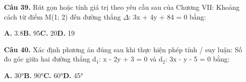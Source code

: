 \documentclass[11pt,a4paper]{article}
\begin{document}
\textbf{\color{primary} Câu 39.} Rút gọn hoặc tính giá trị theo yêu cầu sau của Chương VII: Khoảng cách từ điểm M(1; 2) đến đường thẳng $\Delta$: 3x + 4y + 84 = 0 bằng:\par
\hspace*{1.5em}\textbf{A.} 3.8\quad\quad \textbf{B.} 95\quad\quad \textbf{C.} 20\quad\quad \textbf{D.} 19\par\vspace{2pt}
\textbf{\color{primary} Câu 40.} Xác định phương án đúng sau khi thực hiện phép tính / suy luận: Số đo góc giữa hai đường thẳng d$_1$: x - 2y + 3 = 0 và d$_2$: 3x - y - 5 = 0 bằng:\par
\hspace*{1.5em}\textbf{A.} 30°\quad\quad \textbf{B.} 90°\quad\quad \textbf{C.} 60°\quad\quad \textbf{D.} 45°\par\vspace{2pt}
\end{document}

